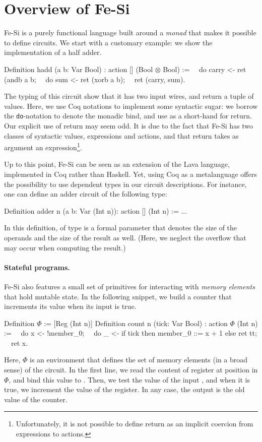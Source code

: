 \documentclass[preprint]{sigplanconf}
\begin{document}

\section{Overview of Fe-Si}
Fe-Si is a purely functional language built around a \emph{monad} that
makes it possible to define circuits. We start with a customary
example: we show the implementation of a half adder.
\begin{coq}
Definition hadd (a b: Var Bool) : action [] (Bool $\otimes$ Bool) :=
$\quad$do carry <- ret (andb a b; 
$\quad$do sum     <- ret (xorb a b);
$\quad$ret (carry, sum).  
\end{coq}
The typing of this circuit show that it has two input wires, and
return a tuple of values. 
%
Here, we use Coq notations to implement some syntactic sugar: we
borrow the \texttt{do}-notation to denote the monadic bind, and use
 as a short-hand for return. 
% 
Our explicit use of return may seem odd. It is due to the fact that
Fe-Si has two classes of syntactic values, expressions and actions,
and that return takes as argument an
expression\footnote{Unfortunately, it is not possible to define return
  as an implicit coercion from expressions to actions.}. 

Up to this point, Fe-Si can be seen as an extension of the Lava
language, implemented in Coq rather than Haskell. Yet, using Coq as a
metalanguage offers the possibility to use dependent types in our
circuit descriptions. For instance, one can define an adder circuit of
the following type:
\begin{coq}
Definition adder n (a b: Var (Int n)): action [] (Int n) := ...
\end{coq}
In this definition,  of type  is a formal parameter
that denotes the size of the operands and the size of the result as
well. (Here, we neglect the overflow that may occur when computing the
result.)

\paragraph{Stateful programs.}
Fe-Si also features a small set of primitives for interacting with
\emph{memory elements} that hold mutable state. In the following
snippet, we build a counter that increments its value when its input
is true.
\begin{coq}
Definition $\Phi$ := [Reg (Int n)]
Definition count n (tick: Var Bool) : action $\Phi$ (Int n) :=
$\quad$do x <- !member_0;
$\quad$do _ <- if tick then {member_0 ::= x + 1} else {ret tt}; 
$\quad$ret x. 
\end{coq}
Here, $\Phi$ is an environment that defines the set of memory elements
(in a broad sense) of the circuit. In the first line, we read the
content of register at position  in $\Phi$, and bind this
value to . Then, we test the value of the input ,
and when it is true, we increment the value of the register. In any
case, the output is the old value of the counter.
\end{document}
